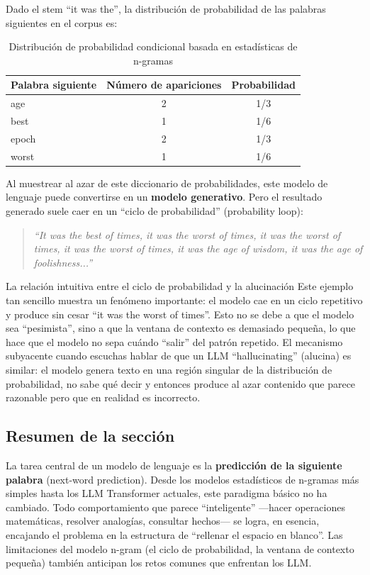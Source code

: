 Dado el stem ``it was the'', la distribución de probabilidad de las palabras siguientes en el corpus es:

\begin{table}[H]
\centering
\begin{tabular}{lcc}
\toprule
\textbf{Palabra siguiente} & \textbf{Número de apariciones} & \textbf{Probabilidad} \\
\midrule
age       & 2 & 1/3 \\
best      & 1 & 1/6 \\
epoch     & 2 & 1/3 \\
worst     & 1 & 1/6 \\
\bottomrule
\end{tabular}
\caption{Distribución de probabilidad condicional basada en estadísticas de n-gramas}
\end{table}

Al muestrear al azar de este diccionario de probabilidades, este modelo de lenguaje puede convertirse en un \textbf{modelo generativo}. Pero el resultado generado suele caer en un ``ciclo de probabilidad'' (probability loop):

\begin{quote}
\textit{``It was the best of times, it was the worst of times, it was the worst of times, it was the worst of times, it was the age of wisdom, it was the age of foolishness...''}
\end{quote}

\begin{warningbox}{La relación intuitiva entre el ciclo de probabilidad y la alucinación}
Este ejemplo tan sencillo muestra un fenómeno importante: el modelo cae en un ciclo repetitivo y produce sin cesar ``it was the worst of times''. Esto no se debe a que el modelo sea ``pesimista'', sino a que la ventana de contexto es demasiado pequeña, lo que hace que el modelo no sepa cuándo ``salir'' del patrón repetido. El mecanismo subyacente cuando escuchas hablar de que un LLM ``hallucinating'' (alucina) es similar: el modelo genera texto en una región singular de la distribución de probabilidad, no sabe qué decir y entonces produce al azar contenido que parece razonable pero que en realidad es incorrecto.
\end{warningbox}

\subsection{Resumen de la sección}

La tarea central de un modelo de lenguaje es la \textbf{predicción de la siguiente palabra} (next-word prediction). Desde los modelos estadísticos de n-gramas más simples hasta los LLM Transformer actuales, este paradigma básico no ha cambiado. Todo comportamiento que parece ``inteligente'' —hacer operaciones matemáticas, resolver analogías, consultar hechos— se logra, en esencia, encajando el problema en la estructura de ``rellenar el espacio en blanco''. Las limitaciones del modelo n-gram (el ciclo de probabilidad, la ventana de contexto pequeña) también anticipan los retos comunes que enfrentan los LLM.
